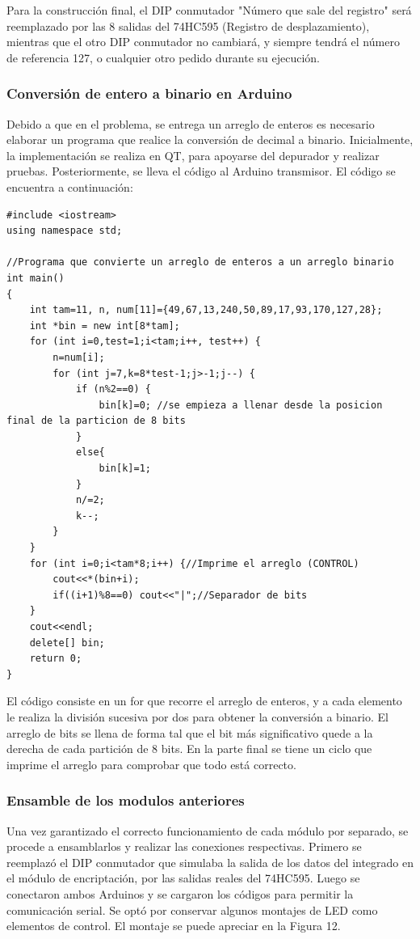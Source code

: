 \documentclass{article}
\begin{document}
Para la construcción final, el DIP conmutador "Número que sale del registro" será reemplazado por las 8 salidas del 74HC595 (Registro de desplazamiento), mientras que el otro DIP conmutador no cambiará, y siempre tendrá el número de referencia 127, o cualquier otro pedido durante su ejecución.
\subsubsection{Conversión de entero a binario en Arduino}
Debido a que en el problema, se entrega un arreglo de enteros es necesario elaborar un programa que realice la conversión de decimal a binario. Inicialmente, la implementación se realiza en QT, para apoyarse del depurador y realizar pruebas. Posteriormente, se lleva el código al Arduino transmisor. El código se encuentra a continuación:

\noindent


\begin{lstlisting}[style=C++]
#include <iostream>
using namespace std;

//Programa que convierte un arreglo de enteros a un arreglo binario
int main()
{
    int tam=11, n, num[11]={49,67,13,240,50,89,17,93,170,127,28};
    int *bin = new int[8*tam];
    for (int i=0,test=1;i<tam;i++, test++) {
        n=num[i];
        for (int j=7,k=8*test-1;j>-1;j--) {
            if (n%2==0) {
                bin[k]=0; //se empieza a llenar desde la posicion final de la particion de 8 bits
            }
            else{
                bin[k]=1;
            }
            n/=2;
            k--;
        }
    }
    for (int i=0;i<tam*8;i++) {//Imprime el arreglo (CONTROL)
        cout<<*(bin+i);
        if((i+1)%8==0) cout<<"|";//Separador de bits
    }
    cout<<endl;
    delete[] bin;
    return 0;
}
\end{lstlisting}

El código consiste en un for que recorre el arreglo de enteros, y a cada elemento le realiza la división sucesiva por dos para obtener la conversión a binario. El arreglo de bits se llena de forma tal que el bit más significativo quede a la derecha de cada partición de 8 bits.
En la parte final se tiene un ciclo que imprime el arreglo para comprobar que todo está correcto.

\subsubsection{Ensamble de los modulos anteriores}
Una vez garantizado el correcto funcionamiento de cada módulo por separado, se procede a ensamblarlos y realizar las conexiones respectivas. Primero se reemplazó el DIP conmutador que simulaba la salida de los datos del integrado en el módulo de encriptación, por las salidas reales del 74HC595. Luego se conectaron ambos Arduinos y se cargaron los códigos para permitir la comunicación serial. Se optó por conservar algunos montajes de LED como elementos de control. El montaje se puede apreciar en la Figura 12.
\end{document}
